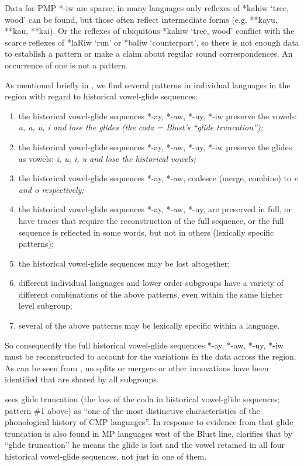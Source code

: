 Data for PMP *-iw are sparse; in many languages only reflexes
of *kahiw ‘tree, wood’ can be found,
but those often reflect intermediate forms (e.g. **kayu, **kau, **kai).
Or the reflexes of ubiquitous *kahiw ‘tree,
wood’ conflict with the scarce reflexes of *laRiw ‘run’ or *baliw
‘counterpart’, so there is not enough data to establish a pattern or make a
claim about regular sound correspondences.
An occurrence of one is not a pattern.

As mentioned briefly in ,
we find several patterns in individual languages in the region
with regard to historical vowel-glide sequences:

\begin{enumerate}
	\item	the historical vowel-glide sequences *-ay,
				*-aw, *-uy, *-iw preserve the vowels: \it{a,
				a, u, i} and lose the glides (the coda = Blust’s “glide truncation”);
	\item	the historical vowel-glide sequences *-ay,
				*-aw, *-uy, *-iw preserve the glides as vowels: \it{i,
				u, i, u} and lose the historical vowels;
	\item	the historical vowel-glide sequences *-ay,
				*-aw, coalesce (merge, combine) to \it{e}
				and \it{o} respectively; \item	the historical vowel-glide sequences
				*-ay, *-aw, *-uy, are preserved in full,
				or have traces that require the reconstruction of the full sequence,
				or the full sequence is reflected in some words,
				but not in others (lexically specific patterns);
	\item	the historical vowel-glide sequences may be lost altogether;
	\item	different individual languages
				and lower order subgroups have a variety of different combinations
				of the above patterns,
				even within the same higher level subgroup;
	\item	several of the above patterns may be lexically specific within a language.
\end{enumerate}

So consequently the full historical vowel-glide sequences *-ay,
*-aw, *-uy, *-iw must be reconstructed to account for the variations
in the data across the region.
As can be seen from ,
no splits or mergers or other innovations have been identified
that are shared by all subgroups.

\citet[264]{Blust1993} sees glide truncation (the loss of the
coda in historical vowel-glide sequences; pattern {\#}1 above)
as “one of the most distinctive characteristics of the phonological
history of CMP languages”.
In response to evidence from \citet{Nothofer1992} that glide
truncation is also found in MP languages west of the Blust line,
\citet[266]{Blust1993} clarifies that by “glide truncation” he
means the glide is lost
and the vowel retained in all four historical vowel-glide sequences,
not just in one of them.

